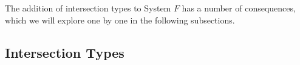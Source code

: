 The addition of intersection types to System $ F $ has a number of consequences,
which we will explore one by one in the following subsections.

\subsection{Intersection Types}


